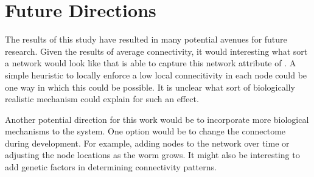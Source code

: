 \section{Future Directions}
The results of this study have resulted in many potential avenues for future research.
Given the results of average connectivity, it would interesting what sort a network would look like that is able to capture this network attribute of \ce.
A simple heuristic to locally enforce a low local connecitivity in each node could be one way in which this could be possible.
It is unclear what sort of biologically realistic mechanism could explain for such an effect.

Another potential direction for this work would be to incorporate more biological mechanisms to the system.
One option would be to change the connectome during development. 
For example, adding nodes to the network over time or adjusting the node locations as the worm grows. 
It might also be interesting to add genetic factors in determining connectivity patterns. 










